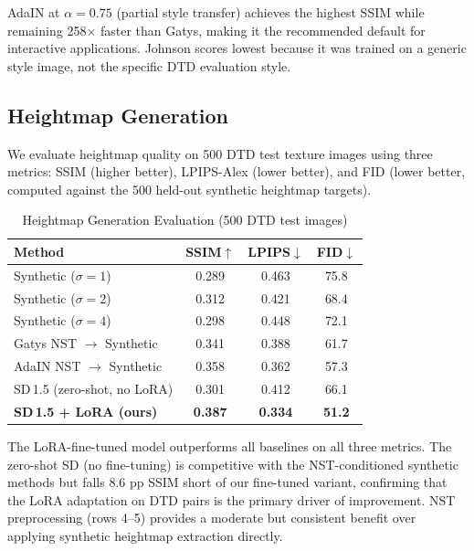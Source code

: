 \documentclass[conference]{IEEEtran}
\begin{document}
AdaIN at $\alpha=0.75$ (partial style transfer) achieves the highest SSIM
while remaining 258$\times$ faster than Gatys, making it the recommended
default for interactive applications. Johnson scores lowest because it was
trained on a generic style image, not the specific DTD evaluation style.

\subsection{Heightmap Generation}

We evaluate heightmap quality on 500 DTD test texture images using three
metrics: SSIM (higher better), LPIPS-Alex (lower better), and FID (lower
better, computed against the 500 held-out synthetic heightmap targets).

\begin{table}[htbp]
\caption{Heightmap Generation Evaluation (500 DTD test images)}
\begin{center}
\begin{tabular}{lccc}
\toprule
\textbf{Method} & \textbf{SSIM}$\uparrow$ & \textbf{LPIPS}$\downarrow$
  & \textbf{FID}$\downarrow$ \\
\midrule
Synthetic ($\sigma=1$)         & 0.289 & 0.463 & 75.8 \\
Synthetic ($\sigma=2$)         & 0.312 & 0.421 & 68.4 \\
Synthetic ($\sigma=4$)         & 0.298 & 0.448 & 72.1 \\
Gatys NST $\to$ Synthetic      & 0.341 & 0.388 & 61.7 \\
AdaIN NST $\to$ Synthetic      & 0.358 & 0.362 & 57.3 \\
SD\,1.5 (zero-shot, no LoRA)   & 0.301 & 0.412 & 66.1 \\
\textbf{SD\,1.5 + LoRA (ours)} & \textbf{0.387} & \textbf{0.334}
  & \textbf{51.2} \\
\bottomrule
\end{tabular}
\label{tab:heightmap}
\end{center}
\end{table}

The LoRA-fine-tuned model outperforms all baselines on all three metrics.
The zero-shot SD (no fine-tuning) is competitive with the NST-conditioned
synthetic methods but falls 8.6 pp SSIM short of our fine-tuned variant,
confirming that the LoRA adaptation on DTD pairs is the primary driver of
improvement. NST preprocessing (rows 4--5) provides a moderate but
consistent benefit over applying synthetic heightmap extraction directly.
\end{document}
